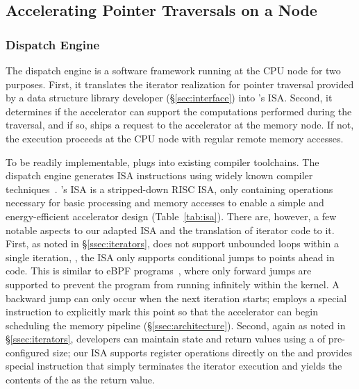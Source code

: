\subsection{Accelerating Pointer Traversals on a Node}
\label{sec:accelerator}


\subsubsection{\pulse Dispatch Engine}\label{ssec:compute_node}
The dispatch engine is a software framework running at the CPU node for two purposes.  First, it translates the iterator realization for pointer traversal provided by a data structure library developer (\S\ref{sec:interface}) into \pulse's ISA. Second, it determines if the accelerator can support the computations performed during the traversal, and if so, ships a request to the accelerator at the memory node. If not, the execution proceeds at the CPU node with regular remote memory accesses.

 To be readily implementable, \pulse plugs into existing compiler toolchains. The dispatch engine generates \pulse ISA instructions using widely known compiler techniques~\cite{llvm}. 
\pulse's ISA is a stripped-down RISC ISA, only containing operations necessary for basic processing and memory accesses to enable a simple and energy-efficient accelerator design (Table~\ref{tab:isa}). There are, however, a few notable aspects to our adapted ISA and the translation of iterator code to it. First, as noted in \S\ref{ssec:iterators}, \pulse does not support unbounded loops within a single iteration, \ie, the ISA only supports conditional jumps to points ahead in code. This is similar to eBPF programs~\cite{ebpfjump}, where only forward jumps are supported to prevent the program from running infinitely within the kernel. A backward jump can only occur when the next iteration starts; \pulse employs a special  instruction to explicitly mark this point so that the accelerator can begin scheduling the memory pipeline (\S\ref{ssec:architecture}). Second, again as noted in \S\ref{ssec:iterators}, developers can maintain state and return values using a  of pre-configured size; our ISA supports register operations directly on the  and provides special  instruction that simply terminates the iterator execution and yields the contents of the  as the return value. 

